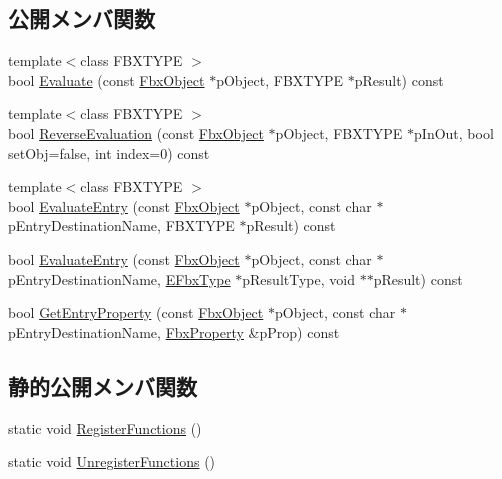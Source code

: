 \subsection*{公開メンバ関数}
\begin{DoxyCompactItemize}
\item 
{\footnotesize template$<$class F\+B\+X\+T\+Y\+PE $>$ }\\bool \hyperlink{class_fbx_binding_operator_a1487485be07b04ef755f8831912d2709}{Evaluate} (const \hyperlink{class_fbx_object}{Fbx\+Object} $\ast$p\+Object, F\+B\+X\+T\+Y\+PE $\ast$p\+Result) const
\item 
{\footnotesize template$<$class F\+B\+X\+T\+Y\+PE $>$ }\\bool \hyperlink{class_fbx_binding_operator_ac7e93e46c1aea6fa49dca09d3f2df342}{Reverse\+Evaluation} (const \hyperlink{class_fbx_object}{Fbx\+Object} $\ast$p\+Object, F\+B\+X\+T\+Y\+PE $\ast$p\+In\+Out, bool set\+Obj=false, int index=0) const
\item 
{\footnotesize template$<$class F\+B\+X\+T\+Y\+PE $>$ }\\bool \hyperlink{class_fbx_binding_operator_ab649606ddda104b1ab6b329fde618654}{Evaluate\+Entry} (const \hyperlink{class_fbx_object}{Fbx\+Object} $\ast$p\+Object, const char $\ast$p\+Entry\+Destination\+Name, F\+B\+X\+T\+Y\+PE $\ast$p\+Result) const
\item 
bool \hyperlink{class_fbx_binding_operator_a00fe9d445d7ffd44b4da764af49e0d9d}{Evaluate\+Entry} (const \hyperlink{class_fbx_object}{Fbx\+Object} $\ast$p\+Object, const char $\ast$p\+Entry\+Destination\+Name, \hyperlink{fbxpropertytypes_8h_a73913a5ddfb20e57c6f25e9e6784bd92}{E\+Fbx\+Type} $\ast$p\+Result\+Type, void $\ast$$\ast$p\+Result) const
\item 
bool \hyperlink{class_fbx_binding_operator_a9201bfc345f36627b6bace7fa3ccb319}{Get\+Entry\+Property} (const \hyperlink{class_fbx_object}{Fbx\+Object} $\ast$p\+Object, const char $\ast$p\+Entry\+Destination\+Name, \hyperlink{class_fbx_property}{Fbx\+Property} \&p\+Prop) const
\end{DoxyCompactItemize}
\subsection*{静的公開メンバ関数}
\begin{DoxyCompactItemize}
\item 
static void \hyperlink{class_fbx_binding_operator_a228cdd04bfe2e075533f2af0db26ea91}{Register\+Functions} ()
\item 
static void \hyperlink{class_fbx_binding_operator_ac1243bdbc2a34d225b5a33c3c16fe2d8}{Unregister\+Functions} ()
\end{DoxyCompactItemize}
